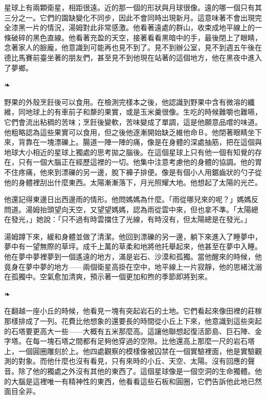 \documentclass[10pt]{article}
\begin{document}
星球上有兩顆衛星，相距很遠。近的那一個的形狀與月球很像。遠的哪一個只有其三分之一。它們的園缺變化不同步，因此不會同時出現新月。這意味著不會出現完全漆黑一片的情況，湯姆對此非常感激。他看著遠處的群山，收束成地平線上的一條破碎的黑色直線。他看著充盈的天空，接著看看黑暗中的手，最後閉上了眼睛，念著家人的臉龐，他意識到可能再也見不到了。見不到辦公室，見不到週五午後在德比馬賽前臺坐著的朋友們，甚至見不到他現在站著的這個地方，他在黑夜中進入了夢鄉。

\begin{center}❧\end{center}

野果的外殼烹飪後可以食用。在檢測完樣本之後，他認識到野果中含有微溶的纖維，同地球上的有車前子和漦的果實，或是玉米羹很像。生吃的時候難嚼也難嚥，它們會流出粘稠的苦味；烹飪後變軟，苦味變成了單調，這是他願意品嚐的味道。他粗略認為這些果實可以食用，但之後他逐漸開始缺乏維他命Ｂ。他閉著眼睛坐下來，背靠在一塊漂礫上。腸道一陣一陣的痛，像是在身體的深處抽筋，把在這個與地球大小相近的星球上獨處的思考拋之腦後。在這個星球上只有他一個有知覺的存在，只有一個大腦正在經歷這裡的一切。他集中注意考慮他的身體的協調。他的胃不住疼痛，他來到漂礫的另一邊，脫下褲子排便。像是有個小人用鋸齒狀的勺子從他的身體裡刮出什麼東西。太陽漸漸落下，月光照耀大地。他想起了太陽的光芒。

他還記得東邊日出西邊雨的情形。他問媽媽為什麼。「雨從哪兒來的呢？」媽媽反問道。湯姆抬頭望向天空，又望望媽媽，認為雨從雲中來，但也拿不準。「太陽總在發光，」她說：「只不過有時雲擋住了光線，有時沒有，但太陽總是在發光。」

湯姆蹲下來，緩和身體並做了清潔。他回到漂礫的另一邊，躺下來進入了睡夢中，夢中有一望無際的草坪。成千上萬的草柔和地將他托舉起來，他甚至在夢中入睡。他在夢中夢裡夢到一個遙遠的地方，滿是岩石、沙漠和孤獨。當他醒來的時候，他竟身在夢中夢的地方——兩個衛星高掛在空中，地平線上一片寂靜，他的思緒沈溺在孤獨中。空氣愈加清爽，預示著一個更加和煦的季節即將到來。

\begin{center}❧\end{center}

在翻越一座小丘的時候，他看見一塊有突起岩石的土地。它們看起來像田裡的莊稼那樣排成了一列。花費比他想象的還要長的時間從小丘上下來，他意識到這些突起的石塔要更高大一些——大概有五米那麼高。這讓他聯想起復活節島、巨石陣、金字塔。在每一塊石塔之間都有足夠他穿過的空隙。比他還高上那麼一尺的岩石塔上，一個圓圈雕刻於上。他四處觀察的模樣像被囚禁在一個實驗裡面，他是實驗觀測的對象。而他什麼也沒有看見，只有來時的小丘、天空、太陽。沒有回應的聲音。除了他的獨處之外沒有其他的東西了。這個星球像是一個空洞的生命獨體。他的大腦是這裡唯一有精神性的東西，他看看這些石板和圓圈，它們告訴他此地已然面目全非。
\end{document}
